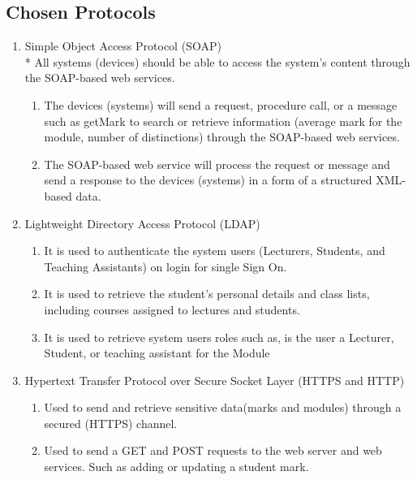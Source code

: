 \documentclass[12pt]{article}
\begin{document}
		\subsection{Chosen Protocols}
			\begin{enumerate}
	                    \item Simple Object Access Protocol (SOAP) \\*
	                    All systems (devices) should be able to access the system’s content through the SOAP-based web services.
	                        \begin{enumerate}
	                            \item The devices (systems) will send a request, procedure call, or a message such as getMark to search or retrieve information (average mark for the module, number of distinctions) through the SOAP-based web services.
	                            \item The SOAP-based web service will process the request or message and send a response to the devices (systems) in a form of a structured XML-based data.
	                        \end{enumerate}
	                    \item Lightweight Directory Access Protocol (LDAP)
	                        \begin{enumerate}
	                            \item It is used to authenticate the system users (Lecturers, Students, and Teaching Assistants) on login for single Sign On.
	                            \item It is used to retrieve the student’s personal details and class lists, including courses assigned to lectures and students.
	                            \item It is used to retrieve system users roles such as, is the user a Lecturer, Student, or teaching assistant for the Module
	                        \end{enumerate}
	                    \item  Hypertext Transfer Protocol over Secure Socket Layer (HTTPS and HTTP)
	                        \begin{enumerate}
	                            \item Used to send and retrieve sensitive data(marks and modules) through a secured (HTTPS) channel.
	                            \item Used to send a GET and POST requests to the web server and web services. Such as adding or updating a student mark.
	                        \end{enumerate}
	
              		\end{enumerate}
			\vspace{0.2in}
			
\end{document}
